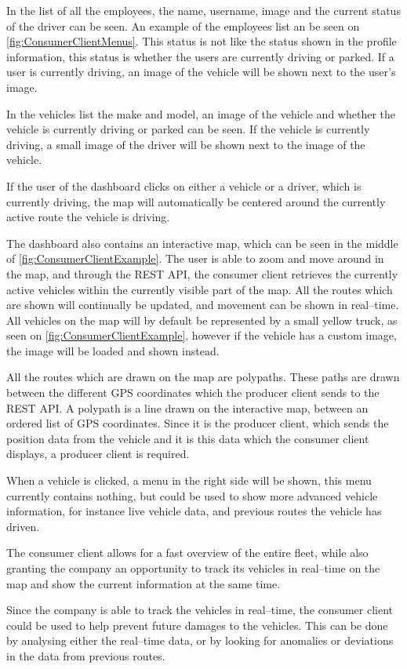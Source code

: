 In the list of all the employees, the name, username, image and the current status of the driver can be seen.
An example of the employees list an be seen on \cref{fig:ConsumerClientMenus}.
This status is not like the status shown in the profile information, this status is whether the users are currently driving or parked.
If a user is currently driving, an image of the vehicle will be shown next to the user's image.

In the vehicles list the make and model, an image of the vehicle and whether the vehicle is currently driving or parked can be seen.
If the vehicle is currently driving, a small image of the driver will be shown next to the image of the vehicle.

If the user of the dashboard clicks on either a vehicle or a driver, which is currently driving, the map will automatically be centered around the currently active route the vehicle is driving.

\bigskip
The dashboard also contains an interactive map, which can be seen in the middle of \cref{fig:ConsumerClientExample}.
The user is able to zoom and move around in the map, and through the REST API, the consumer client retrieves the currently active vehicles within the currently visible part of the map.
All the routes which are shown will continually be updated, and movement can be shown in real--time.
All vehicles on the map will by default be represented by a small yellow truck, as seen on \cref{fig:ConsumerClientExample}, however if the vehicle has a custom image, the image will be loaded and shown instead.

All the routes which are drawn on the map are polypaths. 
These paths are drawn between the different GPS coordinates which the producer client sends to the REST API.
A polypath is a line drawn on the interactive map, between an ordered list of GPS coordinates.
Since it is the producer client, which sends the position data from the vehicle and it is this data which the consumer client displays,
a producer client is required.

When a vehicle is clicked, a menu in the right side will be shown, this menu currently contains nothing, but could be used to show more advanced vehicle information, for instance live vehicle data, and previous routes the vehicle has driven.

\bigskip
The consumer client allows for a fast overview of the entire fleet, while also granting the company an opportunity to track its vehicles in real--time on the map and show the current information at the same time.

Since the company is able to track the vehicles in real--time, the consumer client could be used to help prevent future damages to the vehicles.
This can be done by analysing either the real--time data, or by looking for anomalies or deviations in the data from previous routes.
